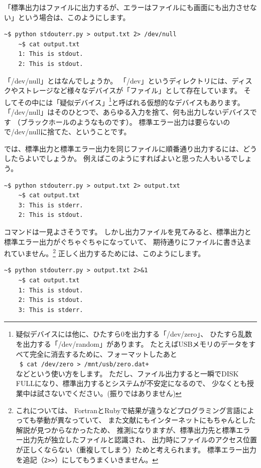 \documentclass[a4j]{ltjsreport}
\begin{document}
    「標準出力はファイルに出力するが、エラーはファイルにも画面にも出力させない」という場合は、このようにします。
    \begin{lstlisting}[numbers=none]
    ~$ python stdouterr.py > output.txt 2> /dev/null 
    ~$ cat output.txt
    1: This is stdout.
    2: This is stdout.
    \end{lstlisting}

    「/dev/null」とはなんでしょうか。
    「/dev」というディレクトリには、ディスクやストレージなど様々なデバイスが「ファイル」として存在しています。
    そしてその中には「疑似デバイス」\footnote{疑似デバイスには他に、ひたすら0を出力する「/dev/zero」、
    ひたすら乱数を出力する「/dev/random」があります。
    たとえばUSBメモリのデータをすべて完全に消去するために、フォーマットしたあと
    \\
    \texttt{~\$ cat /dev/zero > /mnt/usb/zero.dat+}
    \\
    などという使い方をします。
    ただし、ファイル出力すると一瞬でDISK FULLになり、標準出力するとシステムが不安定になるので、
    少なくとも授業中は試さないでください。(振りではありません)}と呼ばれる仮想的なデバイスもあります。
    「/dev/null」はそのひとつで、あらゆる入力を捨て、何も出力しないデバイスです
    （ブラックホールのようなものです）。
    標準エラー出力は要らないので/dev/nullに捨てた、ということです。

    では、標準出力と標準エラー出力を同じファイルに順番通り出力するには、どうしたらよいでしょうか。
    例えばこのようにすればよいと思った人もいるでしょう。
    \begin{lstlisting}[numbers=none]
    ~$ python stdouterr.py > output.txt 2> output.txt
    ~$ cat output.txt
    3: This is stderr.
    2: This is stdout.
    \end{lstlisting}

    コマンドは一見よさそうです。
    しかし出力ファイルを見てみると、標準出力と標準エラー出力がぐちゃぐちゃになっていて、
    期待通りにファイルに書き込まれていません。\footnote{これについては、
    FortranとRubyで結果が違うなどプログラミング言語によっても挙動が異なっていて、
    また文献にもインターネットにもちゃんとした解説が見つからなかったため、
    推測になりますが、標準出力先と標準エラー出力先が独立したファイルと認識され、
    出力時にファイルのアクセス位置が正しくならない（重複してしまう）ためと考えられます。
    標準エラー出力を追記（\texttt{2>>}）にしてもうまくいきません。}
    正しく出力するためには、このようにします。
    \begin{lstlisting}[numbers=none]
    ~$ python stdouterr.py > output.txt 2>&1
    ~$ cat output.txt
    1: This is stdout.
    2: This is stdout.
    3: This is stderr.
    \end{lstlisting}
\end{document}

